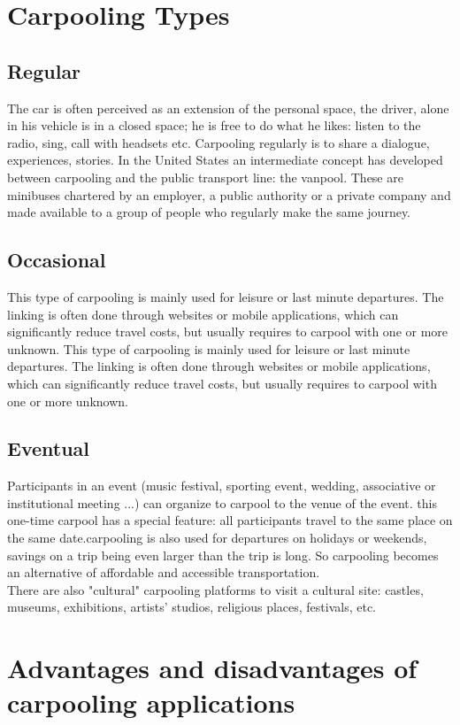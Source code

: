 \section{Carpooling Types}
\subsection{Regular}
The car is often perceived as an extension of the personal space, the driver, alone in his vehicle is in a closed space; he is free to do what he likes: listen to the radio, sing, call with headsets etc. Carpooling regularly is to share a dialogue, experiences, stories. In the United States an intermediate concept has developed between carpooling and the public transport line: the vanpool. These are minibuses chartered by an employer, a public authority or a private company and made available to a group of people who regularly make the same journey.

\subsection{Occasional}
This type of carpooling is mainly used for leisure or last minute departures. The linking is often done through websites or mobile applications, which can significantly reduce travel costs, but usually requires to carpool with one or more unknown. This type of carpooling is mainly used for leisure or last minute departures. The linking is often done through websites or mobile applications, which can significantly reduce travel costs, but usually requires to carpool with one or more unknown.

\subsection{Eventual}
Participants in an event (music festival, sporting event, wedding, associative or institutional meeting ...) can organize to carpool to the venue of the event. this one-time carpool has a special feature: all participants travel to the same place on the same date.carpooling is also used for departures on holidays or weekends, savings on a trip being even larger than the trip is long. So carpooling becomes an alternative of affordable and accessible transportation.\\

There are also "cultural" carpooling platforms to visit a cultural site: castles, 
museums, exhibitions, artists' studios, religious places, festivals, etc.
\section{Advantages and disadvantages of carpooling applications}
